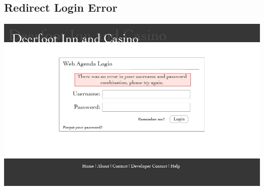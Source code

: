 \documentclass[letterpaper,12pt]{report}
\begin{document}
\begin{landscape}
\section{Redirect Login Error}
\begin{center}
 \includegraphics[scale=0.3]{prototypes/p2redirectLoginError.jpg}
\end{center}




\end{landscape}
%
\end{document}
